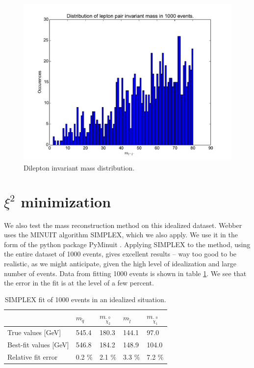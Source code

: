 \documentclass[twoside,english]{uiofysmaster}
\begin{document}
\begin{figure}[hbt]
\centering
\includegraphics[scale=0.7]{figures/dilepton_invariant_mass_comphep-data_smearing-0_events-1000.pdf} 
\caption{Dilepton invariant mass distribution.}
\label{fig:dilepton_invariant_mass_no_smearing}
\end{figure} 



\section{$\xi^2$ minimization}
{\color{gray} We also test the mass reconstruction method on this idealized dataset. Webber uses the {\ttfamily MINUIT} algorithm {\ttfamily SIMPLEX}, which we also apply. We use it in the form of the python package {\ttfamily PyMinuit} \cite{PyMinuit,James:1975dr}. Applying {\ttfamily SIMPLEX} to the method, using the entire dataset of 1000 events, gives excellent results -- way too good to be realistic, as we might anticipate, given the high level of idealization and large number of events. Data from fitting 1000 events is shown in table \ref{table:fit_no_smear}. We see that the error in the fit is at the level of a few percent.}

\begin{table}[hbt]
	\centering
	\begin{tabular}{| l | l | l | l | l |}
		\hline
							&  $m_{\tilde{q}}$ & $m_{\tilde{\chi}_2^0}$ & $m_{\tilde{l}}$ & $m_{\tilde{\chi}_1^0}$ \\ \hline
		True values [GeV] 	& 545.4 & 180.3 & 144.1 & 97.0 \\ \hline
		Best-fit values [GeV] & 546.8 & 184.2 & 148.9 & 104.0 \\ \hline
		Relative fit error  & 0.2 \% & 2.1 \% & 3.3 \% & 7.2 \% \\ \hline
	\end{tabular}
	\caption{SIMPLEX fit of 1000 events in an idealized situation.}
	\label{table:fit_no_smear}
\end{table}
\end{document}
